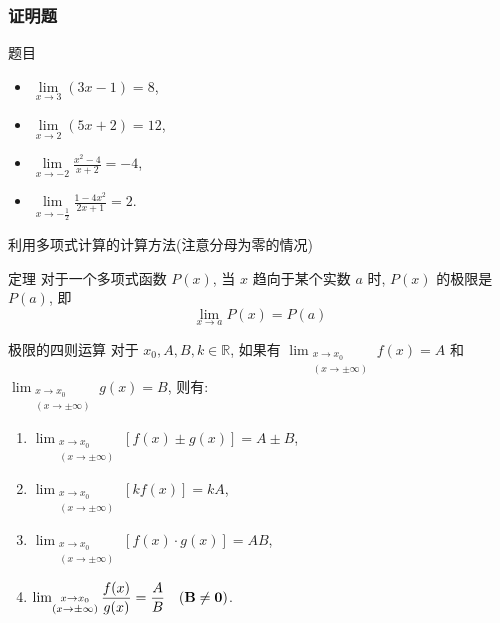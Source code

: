 \documentclass[
10pt,
aspectratio=43,
]{beamer}
\begin{document}
\begin{frame}
	\frametitle{证明题}

	\begin{block}{题目}
		\begin{itemize}
			\item $\lim\limits_{x \to 3}(3x-1)=8$,
			\item $\lim\limits_{x \to 2}(5x+2)=12$,
			\item $\lim\limits_{x \to -2} \displaystyle\frac{x^2-4}{x+2}=-4$,
			\item $\lim\limits_{x \to -\frac{1}{2}} \displaystyle\frac{1-4x^2}{2x+1}=2$.
		\end{itemize}
	\end{block}
\end{frame}

\begin{frame}{利用多项式计算的计算方法(注意分母为零的情况)}
	\begin{exampleblock}{定理}
		对于一个多项式函数 $P(x)$, 当 $x$ 趋向于某个实数 $a$ 时, $P(x)$ 的极限是 $P(a)$, 即
		\[
			\lim_{x \to a} P(x) = P(a)
		\]
	\end{exampleblock}
	\begin{block}{极限的四则运算}
		对于 $x_0,  A,  B,  k \in \mathbb{R}$,  如果有 $\lim _{\substack{x \rightarrow x_0 \\(x \rightarrow \pm\infty)}} f(x)=A$ 和 $ \lim _{\substack{x \rightarrow x_0 \\(x \rightarrow \pm\infty)}} g(x)=B$,   则有:

		\begin{enumerate}
			\item $\lim _{\substack{x \rightarrow x_0 \\(x \rightarrow \pm\infty)}}[f(x) \pm g(x)]=A \pm B$,  \\
			\item
			      $\lim _{\substack{x \rightarrow x_0 \\(x \rightarrow \pm\infty)}}[k f(x)]=k A$,  \\
			\item $\lim _{\substack{x \rightarrow x_0 \\(x \rightarrow\pm \infty)}}[f(x) \cdot g(x)]=A B$,  \\
			\item $\lim _{\substack{x \rightarrow x_0 \\(x \rightarrow\pm \infty)}} \displaystyle\frac{f(x)}{g(x)}=\frac{A}{B} \quad{\bf(B \neq 0)}$.
		\end{enumerate}
	\end{block}
\end{frame}
\end{document}
